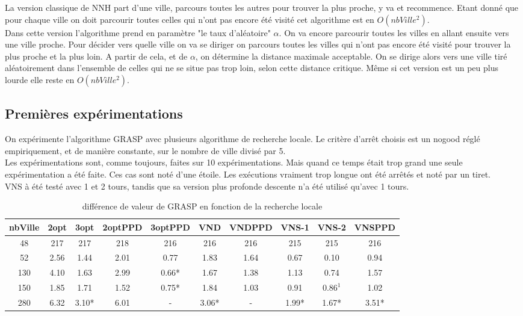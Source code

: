 \documentclass[12pt,a4paper]{article}
\begin{document}
La version classique de NNH part d'une ville, parcours toutes les autres pour trouver la plus proche, y va et recommence.  Etant donné que pour chaque ville on doit parcourir toutes celles qui n'ont pas encore été visité cet algorithme est en $O(nbVille ^2)$.\\

Dans cette version l'algorithme prend en paramètre "le taux d'aléatoire" $\alpha$. On va encore parcourir toutes les villes en allant ensuite vers une ville proche. Pour décider vers quelle ville on va se diriger on parcours toutes les villes qui n'ont pas encore été visité pour trouver la plus proche et la plus loin. A partir de cela, et de $\alpha$, on détermine la distance maximale acceptable. On se dirige alors vers une ville tiré aléatoirement dans l'ensemble de celles qui ne se situe pas trop loin, selon cette distance critique. Même si cet version est un peu plus lourde elle reste en $O(nbVille ^2)$.\\

\subsection{Premières expérimentations}

On expérimente l'algorithme GRASP avec plusieurs algorithme de recherche locale. Le critère d’arrêt choisis est un nogood réglé empiriquement, et de manière constante, sur le nombre de ville divisé par 5.\\
Les expérimentations sont, comme toujours, faites sur 10 expérimentations. Mais quand ce temps était trop grand une seule expérimentation a été faite. Ces cas sont noté d'une étoile. Les exécutions vraiment trop longue ont été arrêtés et noté par un tiret.\\
VNS à été testé avec 1 et 2 tours, tandis que sa version plus profonde descente n'a été utilisé qu'avec 1 tours.\\

\begin{table}[!h]
\leftskip -0.7cm
{
\begin{tabular}{|*{10}{c|}}
  \hline
  nbVille & 2opt & 3opt & 2optPPD & 3optPPD & VND & VNDPPD & VNS-1 & VNS-2 & VNSPPD \\
  \hline
  48 & 217 & 217 & 218 & 216 & 216 & 216 & 215 & 215 & 216 \\ 
  52 & 2.56 & 1.44 & 2.01 & 0.77 & 1.83 & 1.64 & 0.67 & 0.10 & 0.94 \\
  130 & 4.10 & 1.63 & 2.99 & 0.66* & 1.67 & 1.38 & 1.13 & 0.74 & 1.57 \\
  150 & 1.85 & 1.71 & 1.52 &  0.75* & 1.84 & 1.03 & 0.91 & $0.86^1$ & 1.02 \\  
  280 & 6.32 & 3.10* & 6.01 & - & 3.06* & - & 1.99* & 1.67* & 3.51* \\
  \hline
\end{tabular}
}
\caption{différence de valeur de GRASP en fonction de la recherche locale}
\label{recherchelocaleGRASPvaleurs}
\end{table}
\end{document}

